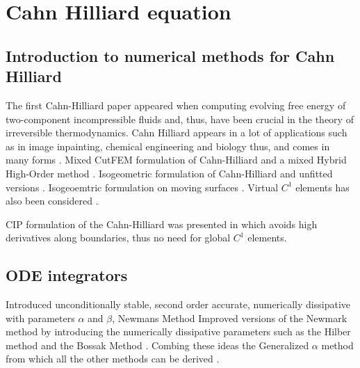
\newpage
\section{Cahn Hilliard equation }%
\label{sec:cahn_hilliard_equation}


\subsection{Introduction to numerical methods for Cahn Hilliard}%
\label{sub:introduction_to_numerical_methods_for_cahn_hilliard}

The first Cahn-Hilliard paper appeared when computing evolving free energy of two-component incompressible fluids  and, thus, have been crucial in the theory of irreversible thermodynamics.\cite{cahn1958free, cahn1959free, falk1992cahn}
Cahn Hilliard appears in a lot of applications such as in image inpainting, chemical engineering and biology \cite{bressloff2014stochastic} thus, and comes in many forms \cite{miranville2017cahn}.
Mixed CutFEM formulation of Cahn-Hilliard \cite{karatzas2021reduced} and a mixed Hybrid High-Order method \cite{chave2016hybrid}. Isogeometric formulation of Cahn-Hilliard \cite{kastner2016isogeometric, gomez2008isogeometric} and unfitted versions \cite{zhao2017variational}. Isogeoemtric formulation on moving
surfaces \cite{zimmermann2019isogeometric}. Virtual $C^{1}$  elements has also been considered \cite{antonietti2016c}.

CIP formulation of the Cahn-Hilliard was presented in \cite{wells2006discontinuous} which avoids high derivatives along boundaries, thus no need for global $C^{1}$ elements.


\subsection{ODE integrators}%
\label{sub:ode_integrators}

      Introduced unconditionally stable, second order accurate, numerically dissipative with parameters $\alpha$ and $ \beta $,  Newmans Method \cite{newmark1959method}
    Improved versions of the Newmark method by introducing the numerically dissipative parameters such as the Hilber method and the Bossak Method \cite{hilber1977improved, wood1980alpha}. Combing these ideas the Generalized $\alpha $ method from which all the other methods can be derived \cite{chung1993time}.


\newpage

